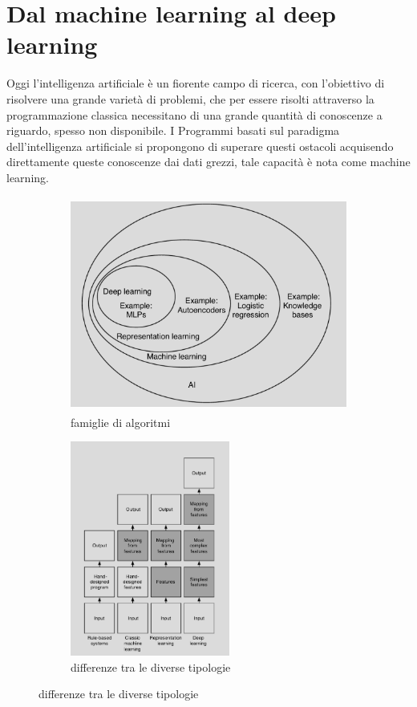 \documentclass[10pt,a4paper]{article}
\begin{document}
\section{Dal machine learning al deep learning}
Oggi l'intelligenza artificiale è un fiorente campo di ricerca, con l'obiettivo di risolvere una grande varietà di problemi, che per essere risolti attraverso la programmazione classica necessitano di una grande quantità di conoscenze a riguardo, spesso non disponibile. I Programmi basati sul paradigma dell'intelligenza artificiale si propongono di superare questi ostacoli acquisendo direttamente queste conoscenze dai dati grezzi, tale capacità è nota come machine learning.

\begin{figure}[h!]
  \centering
  \begin{subfigure}[b]{0.45\linewidth}
  	\centering
    \includegraphics[height=200pt]{AI_venn_diagram.png}
    \caption{famiglie di algoritmi}
  \end{subfigure}
  \begin{subfigure}[b]{0.45\linewidth}
  	\centering
    \includegraphics[height=200pt]{diff_between_aprochs.png}
    \caption{differenze tra le diverse tipologie}
  \end{subfigure}
  \label{fig:garph1}
\end{figure}
\end{document}
